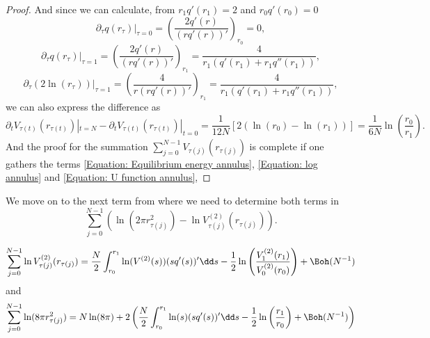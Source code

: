 \begin{proof}
	And since we can calculate, from $r_1 q'(r_1) = 2$ and $r_0 q'(r_0) = 0$
	\begin{equation}
		\partial_\tau q(r_{\tau}) |_{\tau = 0} = \left( \frac{2 q'(r)}{(r q'(r))'}\right)_{r_0} = 0,
	\end{equation}
	\begin{equation}
		\partial_\tau q(r_{\tau}) |_{\tau = 1} = \left( \frac{2 q'(r)}{(r q'(r))'}\right)_{r_1} = \frac{4}{r_1(q'(r_1) + r_1 q''(r_1))},
	\end{equation}
	\begin{equation}
		\partial_\tau (2 \ln(r_\tau)) |_{\tau = 1} = \left( \frac{4}{r (r q'(r))'}\right)_{r_1} = \frac{4}{r_1(q'(r_1) + r_1 q''(r_1))},
	\end{equation}
	we can also express the difference as
	\begin{equation}
		\partial_t V_{\tau(t)}(r_{\tau(t)})|_{t=N}  - \partial_t V_{\tau(t)}(r_{\tau(t)})|_{t=0} = \frac{1}{12 N} \left[ 2 (\ln(r_0) - \ln(r_1)) \right] = \frac{1}{6 N} \ln\left(\frac{r_0}{r_1}\right) .
		\label{Equation: log annulus}
	\end{equation}
	And the proof for the summation $\sum_{j=0}^{N-1} V_{\tau(j)}(r_{\tau(j)})$ is complete if one gathers the terms \eqref{Equation: Equilibrium energy annulus}, \eqref{Equation: log annulus} and \eqref{Equation: U function annulus},

\end{proof}

We move on to the next term from where we need to determine both terms in
\begin{equation}
	\sum_{j=0}^{N-1}\left(\ln(2\pi r^2_{\tau(j)}) - \ln V^{(2)}_{\tau(j)}(r_{\tau(j)}) \right).
\end{equation}

\begin{lema}
		\begin{equation}
		\sum_{j=0}^{N-1}  \ln V^{(2)}_{\tau(j)}(r_{\tau(j)})  = \frac{N}{2} \int_{r_0}^{r_1} \ln(V^{(2)}(s)) (sq'(s))' \dd s  -   \frac{1}{2} \ln \left( \frac{V^{(2)}_{1}(r_1)}{V^{(2)}_{0}(r_{0})} \right) + \Boh(N^{-1})
		\label{Equation: logV annulus}
	\end{equation}
	and
	\begin{equation}
		\sum_{j=0}^{N-1}  \ln(8\pi r^2_{\tau(j)}) = N \ln(8\pi) + 2 \left( \frac{N}{2} \int_{r_0}^{r_1} \ln(s) (s q'(s))' \dd s - \frac{1}{2} \ln\left(\frac{r_1}{r_0}\right) + \Boh(N^{-1}) \right) 
		\label{Equation: log(r) annulus}
	\end{equation}
	\label{Lemma: Annulus Sum 1/2}
\end{lema}

